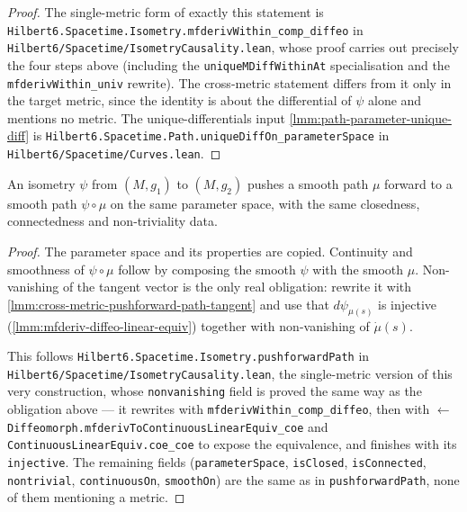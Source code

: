 \begin{proof}
    The single-metric form of exactly this statement is \texttt{Hilbert6.Spacetime.Isometry.mfderivWithin\_comp\_diffeo} in \texttt{Hilbert6/Spacetime/IsometryCausality.lean}, whose proof carries out precisely the four steps above (including the \texttt{uniqueMDiffWithinAt} specialisation and the \texttt{mfderivWithin\_univ} rewrite). The cross-metric statement differs from it only in the target metric, since the identity is about the differential of $\psi$ alone and mentions no metric. The unique-differentials input \ref{lmm:path-parameter-unique-diff} is \texttt{Hilbert6.Spacetime.Path.uniqueDiffOn\_parameterSpace} in \texttt{Hilbert6/Spacetime/Curves.lean}.
\end{proof}

\begin{lemma}
    \label{lmm:cross-metric-pushforward-path}
    \leanok
    An isometry $\psi$ from $(M,g_1)$ to $(M,g_2)$ pushes a smooth path $\mu$ forward to a smooth path $\psi \circ \mu$ on the same parameter space, with the same closedness, connectedness and non-triviality data.
\end{lemma}
\begin{proof}
    \leanok
    The parameter space and its properties are copied. Continuity and smoothness of $\psi \circ \mu$ follow by composing the smooth $\psi$ with the smooth $\mu$. Non-vanishing of the tangent vector is the only real obligation: rewrite it with \ref{lmm:cross-metric-pushforward-path-tangent} and use that $d\psi_{\mu(s)}$ is injective (\ref{lmm:mfderiv-diffeo-linear-equiv}) together with non-vanishing of $\dot\mu(s)$.

    This follows \texttt{Hilbert6.Spacetime.Isometry.pushforwardPath} in \texttt{Hilbert6/Spacetime/IsometryCausality.lean}, the single-metric version of this very construction, whose \texttt{nonvanishing} field is proved the same way as the obligation above --- it rewrites with \texttt{mfderivWithin\_comp\_diffeo}, then with $\leftarrow$\,\texttt{Diffeomorph.mfderivToContinuousLinearEquiv\_coe} and \texttt{ContinuousLinearEquiv.coe\_coe} to expose the equivalence, and finishes with its \texttt{injective}. The remaining fields (\texttt{parameterSpace}, \texttt{isClosed}, \texttt{isConnected}, \texttt{nontrivial}, \texttt{continuousOn}, \texttt{smoothOn}) are the same as in \texttt{pushforwardPath}, none of them mentioning a metric.
\end{proof}

